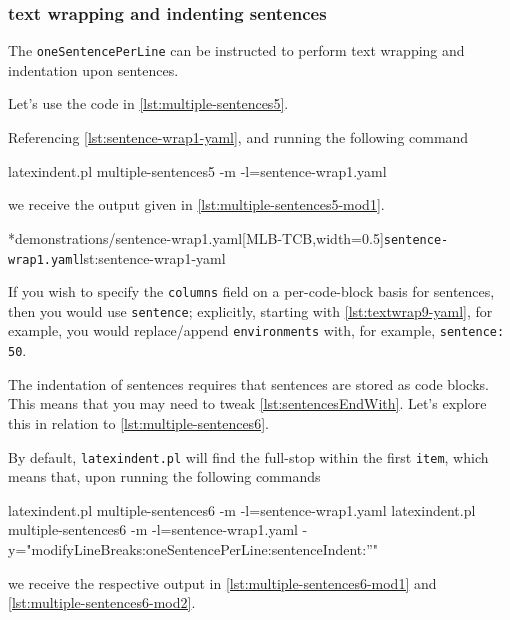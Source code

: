 \subsubsection{text wrapping and indenting sentences}
	The \texttt{oneSentencePerLine}%
	 can be instructed to perform
	text wrapping and indentation upon sentences.

	Let's use the code in \cref{lst:multiple-sentences5}.


	Referencing \cref{lst:sentence-wrap1-yaml}, and running the following command
	\begin{commandshell}
latexindent.pl multiple-sentences5 -m -l=sentence-wrap1.yaml
\end{commandshell}
	we receive the output given in \cref{lst:multiple-sentences5-mod1}.

	\begin{cmhtcbraster}[ raster left skip=-3.5cm,
			raster right skip=-2cm,
			raster force size=false,
			raster column 1/.style={add to width=.1\textwidth},
			raster column skip=.06\linewidth]
		\cmhlistingsfromfile[style=yaml-LST]*{demonstrations/sentence-wrap1.yaml}[MLB-TCB,width=0.5\textwidth]{\texttt{sentence-wrap1.yaml}}{lst:sentence-wrap1-yaml}
	\end{cmhtcbraster}

	If you wish to specify the \texttt{columns} field on a per-code-block basis
	for sentences, then you would use \texttt{sentence}; explicitly, starting with
	\vref{lst:textwrap9-yaml}, for example, you would replace/append
	\texttt{environments} with, for example, \texttt{sentence: 50}.

	The indentation of sentences requires that sentences are stored as code blocks. This
	means that you may need to tweak \vref{lst:sentencesEndWith}. Let's explore this in
	relation to \cref{lst:multiple-sentences6}.


	By default, \texttt{latexindent.pl} will find the full-stop within the first
	\texttt{item}, which means that, upon running the following commands
	\begin{commandshell}
latexindent.pl multiple-sentences6 -m -l=sentence-wrap1.yaml 
latexindent.pl multiple-sentences6 -m -l=sentence-wrap1.yaml -y="modifyLineBreaks:oneSentencePerLine:sentenceIndent:''"
\end{commandshell}
	we receive the respective output in \cref{lst:multiple-sentences6-mod1} and
	\cref{lst:multiple-sentences6-mod2}.

